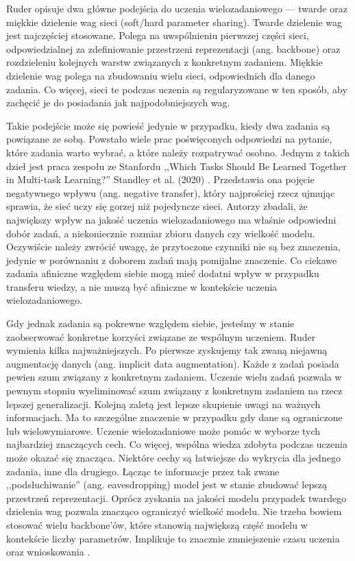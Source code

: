 Ruder opisuje dwa główne podejścia do uczenia wielozadaniowego — twarde oraz miękkie dzielenie wag sieci (soft/hard parameter sharing). Twarde dzielenie wag jest najczęściej stosowane. Polega na uwspólnieniu pierwszej części sieci, odpowiedzialnej za zdefiniowanie przestrzeni reprezentacji (ang. backbone) oraz rozdzieleniu kolejnych warstw związanych z konkretnym zadaniem. Miękkie dzielenie wag polega na zbudowaniu wielu sieci, odpowiednich dla danego zadania. Co więcej, sieci te podczas uczenia są regularyzowane w ten sposób, aby zachęcić je do posiadania jak najpodobniejszych wag.

Takie podejście może się powieść jedynie w przypadku, kiedy dwa zadania są powiązane ze sobą. Powstało wiele prac poświęconych odpowiedzi na pytanie, które zadania warto wybrać, a które należy rozpatrywać osobno. Jednym z takich dzieł jest praca zespołu ze Stanfordu ,,Which Tasks Should Be Learned Together in Multi-task Learning?'' Standley et al. (2020) \cite{standley2020tasks}. Przedstawia ona pojęcie negatywnego wpływu (ang. negative transfer), który najprościej rzecz ujmując sprawia, że sieć uczy się gorzej niż pojedyncze sieci. Autorzy zbadali, że największy wpływ na jakość uczenia wielozadaniowego ma właśnie odpowiedni dobór zadań, a niekoniecznie rozmiar zbioru danych czy wielkość modelu. Oczywiście należy zwrócić uwagę, że przytoczone czynniki nie są bez znaczenia, jedynie w porównaniu z doborem zadań mają pomijalne znaczenie. Co ciekawe zadania afiniczne względem siebie mogą mieć dodatni wpływ w przypadku transferu wiedzy, a nie muszą być afiniczne w kontekście uczenia wielozadaniowego.

Gdy jednak zadania są pokrewne względem siebie, jesteśmy w stanie zaobserwować konkretne korzyści związane ze wspólnym uczeniem. Ruder wymienia kilka najważniejszych. Po pierwsze zyskujemy tak zwaną niejawną augmentację danych (ang. implicit data augmentation). Każde z zadań posiada pewien szum związany z konkretnym zadaniem. Uczenie wielu zadań pozwala w pewnym stopniu wyeliminować szum związany z konkretnym zadaniem na rzecz lepszej generalizacji. Kolejną zaletą jest lepsze skupienie uwagi na ważnych informacjach. Ma to szczególne znaczenie w przypadku gdy dane są ograniczone lub wielowymiarowe. Uczenie wielozadaniowe może pomóc w wyborze tych najbardziej znaczących cech. Co więcej, wspólna wiedza zdobyta podczas uczenia może okazać się znacząca. Niektóre cechy są łatwiejsze do wykrycia dla jednego zadania, inne dla drugiego. Łącząc te informacje przez tak zwane ,,podsłuchiwanie'' (ang. eavesdropping) model jest w stanie zbudować lepszą przestrzeń reprezentacji. Oprócz zyskania na jakości modelu przypadek twardego dzielenia wag pozwala znacząco ograniczyć wielkość modelu. Nie trzeba bowiem stosować wielu backbone'ów, które stanowią największą część modelu w kontekście liczby parametrów. Implikuje to znacznie zmniejszenie czasu uczenia oraz wnioskowania \cite{standley2020tasks}.
